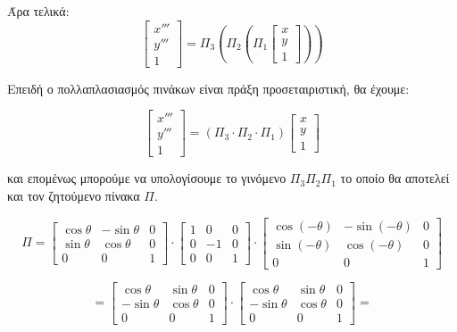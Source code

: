 Άρα τελικά:
\[
\begin{bmatrix}
x''' \\ y''' \\ 1
\end{bmatrix}
=
\Pi_3 (\Pi_2 (\Pi_1
\begin{bmatrix}
x \\ y \\ 1
\end{bmatrix}))
\]

Επειδή ο πολλαπλασιασμός πινάκων είναι πράξη προσεταιριστική, θα έχουμε:

\[
\begin{bmatrix}
x''' \\ y''' \\ 1
\end{bmatrix}
=
(\Pi_3 \cdot \Pi_2 \cdot \Pi_1)
\begin{bmatrix}
x \\ y \\ 1
\end{bmatrix}
\]

και επομένως μπορούμε να υπολογίσουμε το γινόμενο $\Pi_3 \Pi_2 \Pi_1$ το οποίο θα αποτελεί και τον ζητούμενο πίνακα $\Pi$.

\[
\Pi =
\begin{bmatrix}
\cos \theta & -\sin \theta & 0 \\
\sin \theta & \cos \theta & 0 \\
0 & 0 & 1
\end{bmatrix}
\cdot
\begin{bmatrix}
1 & 0 & 0 \\
0 & -1 & 0 \\
0 & 0 & 1
\end{bmatrix}
\cdot
\begin{bmatrix}
\cos(-\theta) & -\sin(-\theta) & 0 \\
\sin(-\theta) & \cos(-\theta) & 0 \\
0 & 0 & 1
\end{bmatrix}
\]

\[
=
\begin{bmatrix}
\cos \theta & \sin \theta & 0 \\
-\sin \theta & \cos \theta & 0 \\
0 & 0 & 1
\end{bmatrix}
\cdot
\begin{bmatrix}
\cos \theta & \sin \theta & 0 \\
-\sin \theta & \cos \theta & 0 \\
0 & 0 & 1
\end{bmatrix}
=
\]

